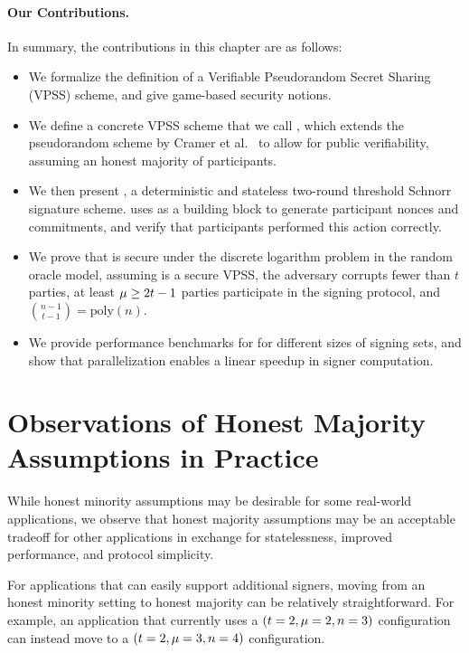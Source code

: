 \paragraph{\bf Our Contributions.}
In summary,
the contributions in this chapter are as follows:
\begin{itemize}
  \item We formalize the definition of a Verifiable Pseudorandom Secret Sharing (VPSS) scheme,
    and give game-based security notions.
  \item We define a concrete VPSS scheme that we call \DVRFOne,
    which extends the pseudorandom scheme by Cramer et al.~\cite{CramerDI05} to allow for public verifiability,
    assuming an honest majority of participants.
  \item We then present \glitter,
    a deterministic and stateless two-round threshold Schnorr signature scheme.
    \glitter uses \DVRFOne as a building block to generate participant nonces and commitments,
    and verify that participants performed this action correctly.
  \item We prove that \glitter is secure under the discrete logarithm problem
    in the random oracle model,
    assuming \DVRFOne is a secure VPSS,
    the adversary corrupts fewer than $t$ parties,
    at least $\mu \geq 2t-1$ parties participate in the signing protocol,
    and ${n-1\choose t-1} = \text{poly}(n)$.
  \item We provide performance benchmarks for \glitter for different sizes of signing sets,
    and show that parallelization enables a linear speedup in signer computation.
\end{itemize}

\section{Observations of Honest Majority Assumptions in Practice}
\label{hon-maj-obs}

While honest minority assumptions may be desirable for some real-world applications,
we observe that honest majority assumptions may be an acceptable tradeoff for other applications in exchange for statelessness, improved performance, and protocol simplicity.

For applications that can easily support additional signers,
moving from an honest minority setting to honest majority can be relatively straightforward.
For example,
an application that currently uses a $(t=2, \mu=2, n=3)$ configuration can instead move to a $(t=2, \mu=3, n=4)$ configuration.

